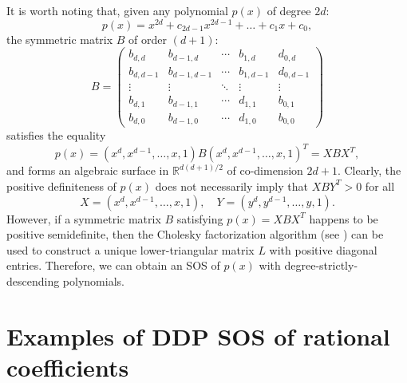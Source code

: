\documentclass[runningheads]{llncs}
\begin{document}
It is worth noting that, given any polynomial \( p(x) \) of degree \( 2d \):
$$
p(x) = x^{2d} + c_{2d-1} x^{2d-1} + \dots + c_1 x + c_0,
$$
the symmetric matrix \( B \) of order \( (d+1) \):
$$
B = \begin{pmatrix}
b_{d,d} & b_{d-1,d} & \cdots & b_{1,d} & d_{0,d} \\
b_{d,d-1} & b_{d-1,d-1} & \cdots & b_{1,d-1} & d_{0,d-1} \\
\vdots & \vdots & \ddots & \vdots & \vdots \\
b_{d,1} & b_{d-1,1} & \cdots & d_{1,1} & b_{0,1} \\
b_{d,0} & b_{d-1,0} & \cdots & d_{1,0} & b_{0,0}
\end{pmatrix}
$$
satisfies the equality
$$
p(x) = (x^d, x^{d-1}, \ldots, x, 1) B (x^d, x^{d-1}, \ldots, x, 1)^T = X B X^T,
$$
and forms an algebraic surface in \( \mathbb{R}^{d(d+1)/2} \) of co-dimension \( 2d+1 \). 
Clearly, the positive definiteness of \( p(x) \) does not necessarily imply that \( XBY^T > 0 \) for all
$$
X = (x^d, x^{d-1}, \ldots, x, 1), \quad Y = (y^d, y^{d-1}, \ldots, y, 1).
$$
However, if a symmetric matrix \( B \) satisfying \( p(x) = XBX^T \) happens to be positive semidefinite, then the Cholesky factorization algorithm (see \cite{Gathen2003,Horn1985}) can be used to construct a unique lower-triangular matrix \( L \) with positive diagonal entries. Therefore, we can obtain an SOS of \( p(x) \) with degree-strictly-descending polynomials.  


\section{Examples of DDP SOS of rational coefficients}
\end{document}
